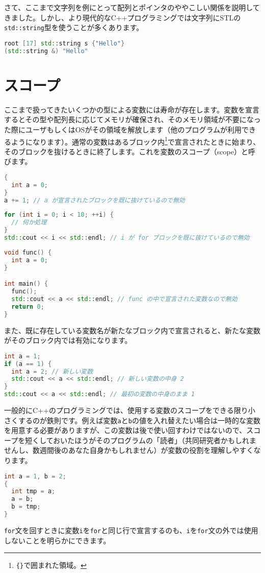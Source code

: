 さて、ここまで文字列を例にとって配列とポインタのややこしい関係を説明してきました。しかし、より現代的なC++プログラミングでは文字列にSTLの\texttt{std::string}型を使うことが多くあります。
\begin{lstlisting}[language=c++]
root [17] std::string s {"Hello"}
(std::string &) "Hello"
\end{lstlisting}

\section{スコープ}
\label{sec:scope}

ここまで扱ってきたいくつかの型による変数には寿命が存在します。変数を宣言するとその型や配列長に応じてメモリが確保され、そのメモリ領域が不要になった際にユーザもしくはOSがその領域を解放します（他のプログラムが利用できるようになります）。通常の変数はあるブロック内\footnote{\texttt{\{\}}で囲まれた領域。}で宣言されたときに始まり、そのブロックを抜けるときに終了します。これを変数のスコープ（scope）と呼びます。
\begin{lstlisting}[language=c++]
{
  int a = 0;
}
a += 1; // a が宣言されたブロックを既に抜けているので無効
\end{lstlisting}

\begin{lstlisting}[language=c++]
for (int i = 0; i < 10; ++i) {
  // 何か処理
}
std::cout << i << std::endl; // i が for ブロックを既に抜けているので無効
\end{lstlisting}

\begin{lstlisting}[language=c++]
void func() {
  int a = 0;
}

int main() {
  func();
  std::cout << a << std::endl; // func の中で宣言された変数なので無効
  return 0;
}
\end{lstlisting}

また、既に存在している変数名が新たなブロック内で宣言されると、新たな変数がそのブロック内では有効になります。

\begin{lstlisting}[language=c++]
int a = 1;
if (a == 1) {
  int a = 2; // 新しい変数
  std::cout << a << std::endl; // 新しい変数の中身 2
}
std::cout << a << std::endl; // 最初の変数の中身のまま 1
\end{lstlisting}

一般的にC++のプログラミングでは、使用する変数のスコープをできる限り小さくするのが鉄則です。例えば変数\texttt{a}と\texttt{b}の値を入れ替えたい場合は一時的な変数を用意する必要がありますが、この変数は後で使い回すわけではないので、スコープを短くしておいたほうがそのプログラムの「読者」（共同研究者かもしれませんし、数週間後のあなた自身かもしれません）が変数の役割を理解しやすくなります。
\begin{lstlisting}[language=c++]
int a = 1, b = 2;
{
  int tmp = a;
  a = b;
  b = tmp;
}
\end{lstlisting}
\texttt{for}文を回すときに変数\texttt{i}を\texttt{for}と同じ行で宣言するのも、\texttt{i}を\texttt{for}文の外では使用しないことを明らかにできます。

